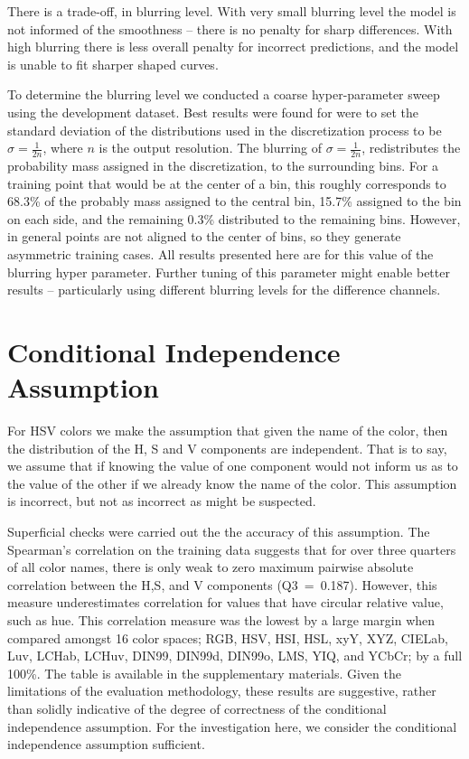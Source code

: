 \documentclass[11pt,letterpaper]{article}
\begin{document}
There is a trade-off, in blurring level.
With very small blurring level the model is not informed of the smoothness -- there is no penalty for sharp differences.
With high blurring there is less overall penalty for incorrect predictions,
and the model is unable to fit sharper shaped curves.

To determine the blurring level we conducted a coarse hyper-parameter sweep using the development dataset.
Best results were found for were to set the standard deviation of the distributions used in the discretization process to be $\sigma=\frac{1}{2n}$, where $n$ is the output resolution.
The blurring of $\sigma=\frac{1}{2n}$, redistributes the probability mass assigned in the discretization, to the surrounding bins.
For a training point that would be at the center of a bin, this roughly corresponds to 68.3\% of the probably mass assigned to the central bin, 15.7\% assigned to the bin on each side, and the remaining 0.3\% distributed to the remaining bins.
However, in general points are not aligned to the center of bins, so they generate asymmetric training cases.
All results presented here are for this value of the blurring hyper parameter.
Further tuning of this parameter might enable better results -- particularly using different blurring levels for the difference channels.


\section{Conditional Independence Assumption}
For HSV colors we make the assumption that given the name of the color, then the distribution of the H, S and V components are independent.
That is to say, we assume that if knowing the value of one component would not inform us as to the value of the other if we already know the name of the color.
This assumption is incorrect, but not as incorrect as might be suspected.


Superficial checks were carried out the the accuracy of this assumption.
The Spearman's correlation on the training data suggests that for over three quarters of all color names, there is only weak to zero maximum pairwise absolute correlation between the H,S, and V components (\mbox{Q3 = 0.187}).
However, this measure underestimates correlation for values that have circular relative value, such as hue.
This correlation measure was the lowest by a large margin  when compared amongst 16 color spaces; RGB, HSV, HSI, HSL, xyY, XYZ, CIELab, Luv, LCHab, LCHuv, DIN99, DIN99d, DIN99o, LMS, YIQ, and YCbCr; by a full 100\%.
The table is available in the supplementary materials.
Given the limitations of the evaluation methodology, these results are suggestive, rather than solidly indicative of the degree of correctness of the conditional independence assumption.
For the investigation here, we consider the conditional independence assumption sufficient.
\end{document}
